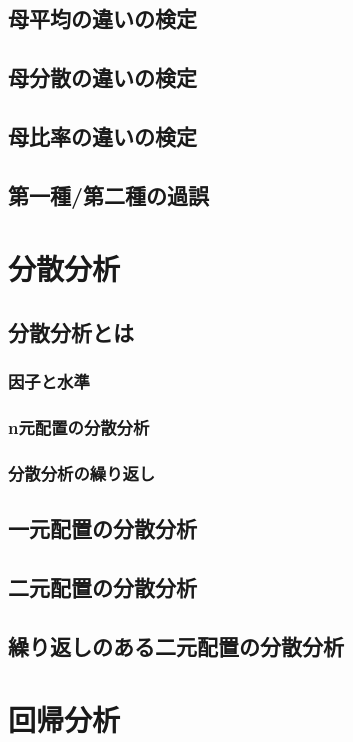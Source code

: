 \documentclass[11pt,a4paper,uplatex]{ujreport} 	%
\begin{document}
\subsection{母平均の違いの検定}
\subsection{母分散の違いの検定}
\subsection{母比率の違いの検定}
\subsection{第一種/第二種の過誤}

\section{分散分析}
\subsection{分散分析とは}
\subsubsection{因子と水準}
\subsubsection{n元配置の分散分析}
\subsubsection{分散分析の繰り返し}
\subsection{一元配置の分散分析}
\subsection{二元配置の分散分析}
\subsection{繰り返しのある二元配置の分散分析}
\section{回帰分析}
\end{document}
